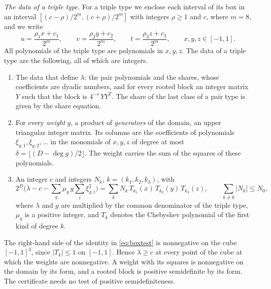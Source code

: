 \documentclass[reqno,a4paper,11pt]{amsart}
\numberwithin{equation}{section}
\begin{document}
\emph{The data of a triple type.} For a triple type we enclose each interval of its box in an interval $[(c - \rho)/2^m, (c + \rho)/2^m]$ with integers $\rho \geq 1$ and $c$, where $m = 8$, and we write
$$
u = \frac{\rho_1 x + c_1}{2^m}, \qquad v = \frac{\rho_2 y + c_2}{2^m}, \qquad t = \frac{\rho_3 z + c_3}{2^m}, \qquad x, y, z \in [-1,1].
$$
All polynomials of the triple type are polynomials in $x, y, z$. The data of a triple type are the following, all of which are integers.
\begin{enumerate}
    \item[(B1)] The data that define $\lambda$: the pair polynomials and the shares, whose coefficients are dyadic numbers, and for every rooted block an integer matrix $Y$ such that the block is $4^{-s} \, Y Y^T$. The share of the last class of a pair type is given by the share equation.
    \item[(B2)] For every \emph{weight} $g$, a product of \emph{generators} of the domain, an upper triangular integer matrix. Its columns are the coefficients of polynomials $\xi_{g,1}, \xi_{g,2}, \dots$ in the monomials of $x, y, z$ of degree at most $\delta = \lfloor (D - \deg g)/2 \rfloor$. The weight carries the sum of the squares of these polynomials.
    \item[(B3)] An integer $c$ and integers $N_k$, $k = (k_1, k_2, k_3)$, with
    \begin{equation}\label{eq:boxtest}
    2^D \Big( \lambda - c - \sum_g \mu_g \, g \sum_i \xi_{g,i}^2 \Big) = \sum_{k} N_k \, T_{k_1}(x) \, T_{k_2}(y) \, T_{k_3}(z), \qquad \sum_{k \neq 0} |N_k| \leq N_0 ,
    \end{equation}
    where $\lambda$ and $g$ are multiplied by the common denominator of the triple type, $\mu_g$ is a positive integer, and $T_k$ denotes the Chebyshev polynomial of the first kind of degree $k$.
\end{enumerate}
The right-hand side of the identity in \eqref{eq:boxtest} is nonnegative on the cube $[-1,1]^3$, since $|T_k| \leq 1$ on $[-1,1]$. Hence $\lambda \geq c$ at every point of the cube at which the weights are nonnegative. A weight with its squares is nonnegative on the domain by its form, and a rooted block is positive semidefinite by its form. The certificate needs no test of positive semidefiniteness.
\end{document}
